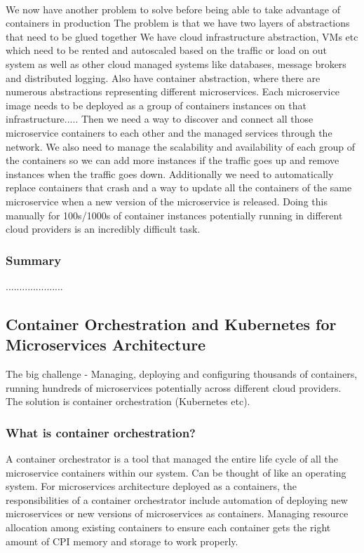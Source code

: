 \paragraph{}
We now have another problem to solve before being able to take advantage of containers in production
The problem is that we have two layers of abstractions that need to be glued together
We have cloud infrastructure abstraction, VMs etc which need to be rented and autoscaled based on the traffic or load on out system as well as other cloud managed systems like databases, message brokers and distributed logging.
Also have container abstraction, where there are numerous abstractions representing different microservices.
Each microservice image needs to be deployed as a group of containers instances on that infrastructure.....
Then we need a way to discover and connect all those microservice containers to each other and the managed services through the network.
We also need to manage the scalability and availability of each group of the containers so we can add more instances if the traffic goes up and remove instances when the traffic goes down.
Additionally we need to automatically replace containers that crash and a way to update all the containers of the same microservice when a new version of the microservice is released.
Doing this manually for 100s/1000s of container instances potentially running in different cloud providers is an incredibly difficult task.

\subsubsection{Summary}
.....................

\subsection{Container Orchestration and Kubernetes for Microservices Architecture}
The big challenge - Managing, deploying and configuring thousands of containers, running hundreds of microservices potentially across different cloud providers.
The solution is container orchestration (Kubernetes etc).

\subsubsection{What is container orchestration?}
A container orchestrator is a tool that managed the entire life cycle of all the microservice containers within our system.
Can be thought of like an operating system.
For microservices architecture deployed as a containers, the responsibilities of a container orchestrator include automation of deploying new microservices or new versions of microservices as containers.
Managing resource allocation among existing containers to ensure each container gets the right amount of CPI memory and storage to work properly.

